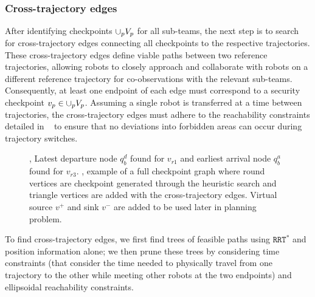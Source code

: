 \documentclass[journal]{IEEEtran}  %
\newcommand{\rrtstar}{$\texttt{RRT}^\texttt{*}$}
\begin{document}
\subsubsection{Cross-trajectory edges}\label{sec:cross-traj-edges}
After identifying checkpoints $\cup_p V_p$ for all sub-teams, the next step is to search for cross-trajectory edges connecting all checkpoints to the respective trajectories. These cross-trajectory edges define viable paths between two reference trajectories, allowing robots to closely approach and collaborate with robots on a different reference trajectory for co-observations with the relevant sub-teams. Consequently, at least one endpoint of each edge must correspond to a security checkpoint $v_{p} \in \cup_p V_p$. Assuming a single robot is transferred at a time between trajectories, the cross-trajectory edges must adhere to the reachability constraints detailed in ~ to ensure that no deviations into forbidden areas can occur during trajectory switches.  

\begin{figure}[htbp]
  \caption{, Latest departure node $q^{d}_{b}$ found for $v_{r1}$ and earliest arrival node $q^{a}_{b}$ found for $v_{r3}$. , example of a full checkpoint graph where round vertices are checkpoint generated through the heuristic search and triangle vertices are added with the cross-trajectory edges. Virtual source $v^{+}$ and sink $v^{-}$ are added to be used later in planning problem.}  
\end{figure}

To find cross-trajectory edges, we first find trees of feasible paths using \rrtstar{} and position information alone; we then prune these trees by considering time constraints (that consider the time needed to physically travel from one trajectory to the other while meeting other robots at the two endpoints) and ellipsoidal reachability constraints.
\end{document}
